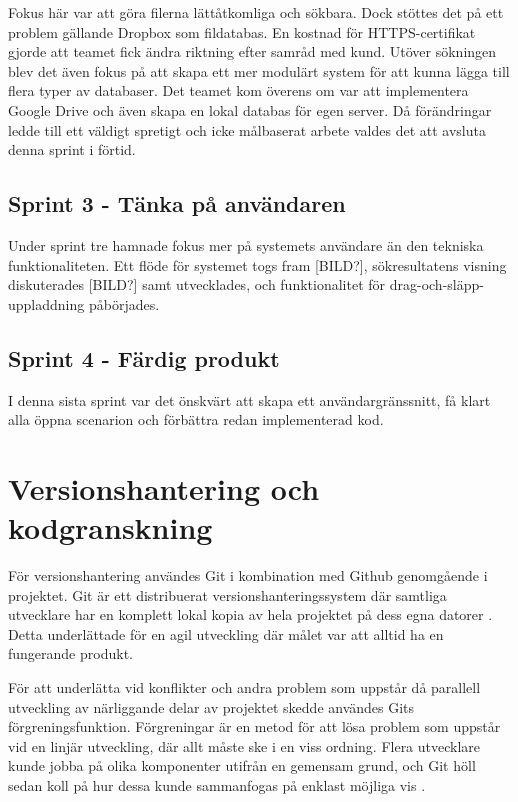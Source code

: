 Fokus här var att göra filerna lättåtkomliga och sökbara. Dock stöttes det på ett problem gällande Dropbox som fildatabas. En kostnad för HTTPS-certifikat gjorde att teamet fick ändra riktning efter samråd med kund. Utöver sökningen blev det även fokus på att skapa ett mer modulärt system för att kunna lägga till flera typer av databaser. Det teamet kom överens om var att implementera Google Drive och även skapa en lokal databas för egen server. Då förändringar ledde till ett väldigt spretigt och icke målbaserat arbete valdes det att avsluta denna sprint i förtid.

\subsection{Sprint 3 - Tänka på användaren}

Under sprint tre hamnade fokus mer på systemets användare än den tekniska funktionaliteten. Ett flöde för systemet togs fram [BILD?], sökresultatens visning diskuterades [BILD?] samt utvecklades, och funktionalitet för drag-och-släpp-uppladdning påbörjades.

\subsection{Sprint 4 - Färdig produkt}

I denna sista sprint var det önskvärt att skapa ett användargränssnitt, få klart alla öppna scenarion och förbättra redan implementerad kod.

\section{Versionshantering och kodgranskning}

För versionshantering användes Git i kombination med Github genomgående i projektet. Git är ett distribuerat versionshanteringssystem där samtliga utvecklare har en komplett lokal kopia av hela projektet på dess egna datorer \cite[kapitel 1.1]{progit}. Detta underlättade för en agil utveckling där målet var att alltid ha en fungerande produkt.

För att underlätta vid konflikter och andra problem som uppstår då parallell utveckling av närliggande delar av projektet skedde användes Gits förgreningsfunktion. Förgreningar är en metod för att lösa problem som uppstår vid en linjär utveckling, där allt måste ske i en viss ordning. Flera utvecklare kunde jobba på olika komponenter utifrån en gemensam grund, och Git höll sedan koll på hur dessa kunde sammanfogas på enklast möjliga vis \cite[kapitel 3.1]{progit}.

